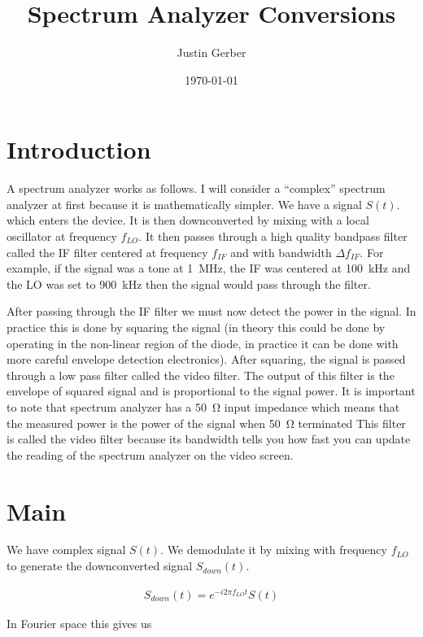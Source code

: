 \documentclass[12pt]{article}
\begin{document}
\title{Spectrum Analyzer Conversions}
\author{Justin Gerber}
\date{\today}
\maketitle

\section{Introduction}

A spectrum analyzer works as follows. 
I will consider a ``complex'' spectrum analyzer at first because it is mathematically simpler. We have a signal $S(t)$. 
which enters the device. 
It is then downconverted by mixing with a local oscillator at frequency $f_{LO}$. 
It then passes through a high quality bandpass filter called the IF filter centered at frequency $f_{IF}$ and with bandwidth $\Delta f_{IF}$. 
For example, if the signal was a tone at \SI{1}{\MHz}, the IF was centered at \SI{100}{\kHz} and the LO was set to \SI{900}{\kHz} then the signal would pass through the filter.

After passing through the IF filter we must now detect the power in the signal. In practice this is done by squaring the signal (in theory this could be done by operating in the non-linear region of the diode, in practice it can be done with more careful envelope detection electronics).
After squaring, the signal is passed through a low pass filter called the video filter.
The output of this filter is the envelope of squared signal and is proportional to the signal power.
It is important to note that spectrum analyzer has a \SI{50}{\ohm} input impedance which means that the measured power is the power of the signal when \SI{50}{\ohm} terminated 
This filter is called the video filter because its bandwidth tells you how fast you can update the reading of the spectrum analyzer on the video screen.

\section{Main}

We have complex signal $S(t)$.
We demodulate it by mixing with frequency $f_{LO}$ to generate the downconverted signal $S_{down}(t)$.

\begin{align}
S_{down}(t) = e^{-i2\pi f_{LO} t}S(t)
\end{align}

In Fourier space this gives us
\end{document}
